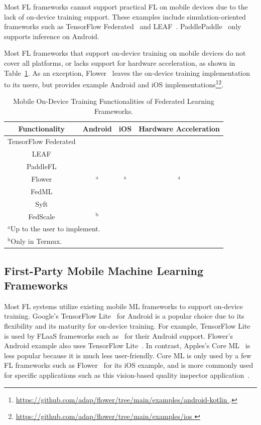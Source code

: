 \documentclass[conference]{IEEEtran}
\newcommand{\cmark}{\ding{51}}
\newcommand{\xmark}{\ding{55}}
\begin{document}
Most FL frameworks cannot support practical FL on mobile devices due to
the lack of on-device training support.
These examples include simulation-oriented frameworks such as
TensorFlow Federated~\cite{tff,kholod2020open} and
LEAF~\cite{caldas2018leaf}.
PaddlePaddle~\cite{ma2019paddlepaddle}
only supports inference on Android.

Most FL frameworks that support on-device training on mobile devices do not
cover all platforms,
or lacks support for hardware acceleration,
as shown in Table~\ref{tab:on-device}.
As an exception,
Flower~\cite{beutel2020flower} leaves the on-device training implementation to
its users,
but provides example Android and iOS implementations\footnote{\url{
    https://github.com/adap/flower/tree/main/examples/android-kotlin
}.}\footnote{\url{
    https://github.com/adap/flower/tree/main/examples/ios
}}.


\begin{table}
\caption{Mobile On-Device Training Functionalities of
    Federated Learning Frameworks.
}
\begin{center}
\begin{tabular}{cccc}
    Functionality&Android&iOS&Hardware Acceleration\\
    \hline
    TensorFlow Federated&\xmark&\xmark&\xmark\\
    LEAF&\xmark&\xmark&\xmark\\
    PaddleFL&\xmark&\xmark&\xmark\\
    Flower&\cmark$^\mathrm{a}$&\cmark$^\mathrm{a}$&\cmark$^\mathrm{a}$\\
    FedML&\cmark&\xmark&\cmark\\
    Syft&\cmark&\cmark&\xmark\\
    FedScale&\cmark$^\mathrm{b}$&\xmark&\cmark\\
    \multicolumn{4}{l}{$^{\mathrm{a}}$Up to the user to implement.}\\
    \multicolumn{4}{l}{$^{\mathrm{b}}$Only in Termux.}
\end{tabular}
\label{tab:on-device}
\end{center}
\end{table}
\subsection{First-Party Mobile Machine Learning Frameworks}

Most FL systems utilize existing mobile ML frameworks to
support on-device training.
Google's TensorFlow Lite~\cite{tensorflow2015-whitepaper,abadi2016tensorflow}
for Android is
a popular choice due to its flexibility and
its maturity for on-device training.
For example, TensorFlow Lite is used by FLaaS frameworks such as~\cite{
    kourtellis2020flaas,katevas2022flaas}
for their Android support.
Flower's Android example also uses
TensorFlow Lite~\cite{beutel2020flower,mathur2021ondevice}.
In contrast, Apples's Core ML~\cite{coreml} is less popular because
it is much less user-friendly.
Core ML is only used by a few FL frameworks such as
Flower~\cite{beutel2020flower} for its iOS example,
and is more commonly used for specific applications
such as this vision-based quality inspector application~\cite{bharti2022edge}.
\end{document}
